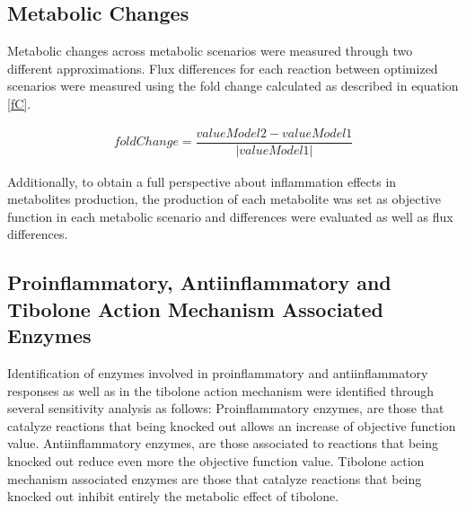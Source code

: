 \subsection*{Metabolic Changes}
Metabolic changes across metabolic scenarios were measured through two different approximations. Flux differences for each reaction between optimized scenarios were measured using the fold change calculated as described in equation \ref{fC}.
\begin{ceqn}
\begin{align}
\label{fC}
   foldChange = \dfrac{valueModel2-valueModel1}{\left|valueModel1\right|}
\end{align}
\end{ceqn}
Additionally, to obtain a full perspective about inflammation effects in metabolites production, the production of each metabolite was set as objective function in each metabolic scenario and differences were evaluated as well as flux differences.
\subsection*{Proinflammatory, Antiinflammatory and Tibolone Action Mechanism Associated Enzymes}
Identification of enzymes involved in proinflammatory and antiinflammatory responses as well as in the tibolone action mechanism were identified through several sensitivity analysis as follows: Proinflammatory enzymes, are those that catalyze reactions that being knocked out allows an increase of objective function value. Antiinflammatory enzymes, are those associated to reactions that being knocked out reduce even more the objective function value. Tibolone action mechanism associated enzymes are those that catalyze reactions that being knocked out inhibit entirely the metabolic effect of tibolone.
